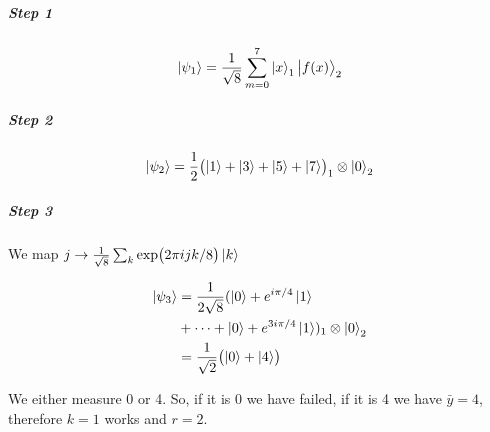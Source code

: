\subparagraph{Step 1}

\begin{equation}
  \ket{\psi _1 }  =  \frac{1}{\sqrt{8}} \sum_{m=0} ^{7} \ket{x}_1 \ket{f(x)}_2
\end{equation}

\subparagraph{Step 2}

\begin{equation}
  \ket{\psi_2} = \frac{1}{2} \qty(\ket{1}+\ket{3}+\ket{5}+\ket{7})_1 \otimes \ket{0}_2
\end{equation}

\subparagraph{Step 3}

We map \( j \rightarrow \frac{1}{\sqrt{8}} \sum_k \exp(2 \pi i j k / 8) \ket{k} \)

\begin{align}
  \ket{\psi_3}
  &= \frac{1}{2 \sqrt{8}} (\ket{0} + e^{i \pi/4} \ket{1} \\
  &+ \dots + \ket{0} + e^{3 i \pi /4}\ket{1})_1 \otimes \ket{0}_2 \\
  &= \frac{1}{\sqrt{2}} \qty(\ket{0}+\ket{4} )
\end{align}

We either measure 0 or 4. So, if it is 0 we have failed, if it is 4 we have \( \bar{y} = 4 \), therefore \( k=1 \)  works and \( r=2 \).
